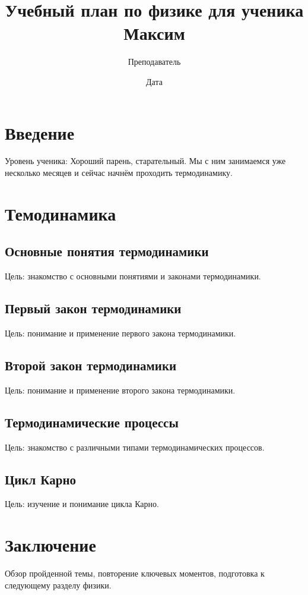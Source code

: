 \documentclass[a4paper,12pt]{article}
\begin{document}
\title{Учебный план по физике для ученика Максим}
\author{Преподаватель}
\date{Дата}

\maketitle

\section*{Введение}
Уровень ученика: Хороший парень, старательный. Мы с ним занимаемся уже несколько месяцев и сейчас начнём проходить термодинамику.

\section{Темодинамика}
\subsection{Основные понятия термодинамики}
Цель: знакомство с основными понятиями и законами термодинамики.

\subsection{Первый закон термодинамики}
Цель: понимание и применение первого закона термодинамики.

\subsection{Второй закон термодинамики}
Цель: понимание и применение второго закона термодинамики.

\subsection{Термодинамические процессы}
Цель: знакомство с различными типами термодинамических процессов.

\subsection{Цикл Карно}
Цель: изучение и понимание цикла Карно.

\section{Заключение}
Обзор пройденной темы, повторение ключевых моментов, подготовка к следующему разделу физики.
\end{document}
